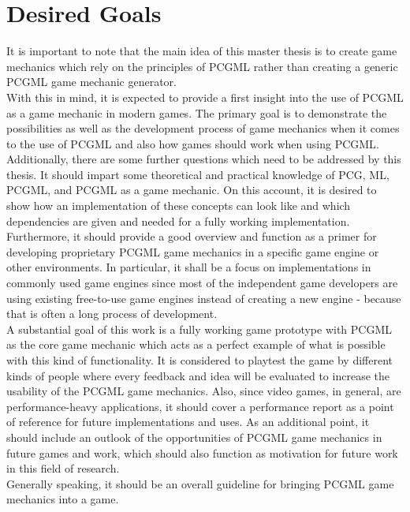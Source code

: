 \documentclass[MGS,Master,english]{twbook}%
\begin{document}
\section{Desired Goals}
It is important to note that the main idea of this master thesis is to create game mechanics which rely on the principles of PCGML rather than creating a generic PCGML game mechanic generator.\\
With this in mind, it is expected to provide a first insight into the use of \ac{PCGML} as a game mechanic in modern games. The primary goal is to demonstrate the possibilities as well as the development process of game mechanics when it comes to the use of \ac{PCGML} and also how games should work when using \ac{PCGML}.\\
Additionally, there are some further questions which need to be addressed by this thesis. It should impart some theoretical and practical knowledge of PCG, ML, \ac{PCGML}, and \ac{PCGML} as a game mechanic. On this account, it is desired to show how an implementation of these concepts can look like and which dependencies are given and needed for a fully working implementation. \\
Furthermore, it should provide a good overview and function as a primer for developing proprietary \ac{PCGML} game mechanics in a specific game engine or other environments. In particular, it shall be a focus on implementations in commonly used game engines since most of the independent game developers are using existing free-to-use game engines instead of creating a new engine - because that is often a long process of development. \\
A substantial goal of this work is a fully working game prototype with \ac{PCGML} as the core game mechanic which acts as a perfect example of what is possible with this kind of functionality. It is considered to playtest the game by different kinds of people where every feedback and idea will be evaluated to increase the usability of the \ac{PCGML} game mechanics. Also, since video games, in general, are performance-heavy applications, it should cover a performance report as a point of reference for future implementations and uses. As an additional point, it should include an outlook of the opportunities of \ac{PCGML} game mechanics in future games and work, which should also function as motivation for future work in this field of research.\\
Generally speaking, it should be an overall guideline for bringing \ac{PCGML} game mechanics into a game.
\end{document}
